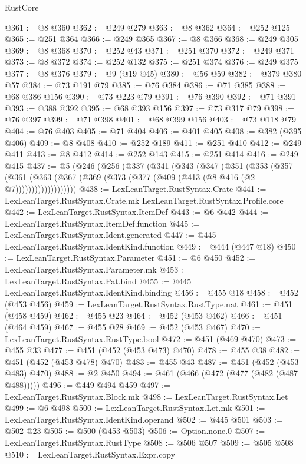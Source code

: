 \begin{lexlean}{RustCore}
\begin{coremodule}
@361 := @8 @360
@362 := @249 @279
@363 := @8 @362
@364 := @252 @125
@365 := @251 @364
@366 := @249 @365
@367 := @8 @366
@368 := @249 @305
@369 := @8 @368
@370 := @252 @43
@371 := @251 @370
@372 := @249 @371
@373 := @8 @372
@374 := @252 @132
@375 := @251 @374
@376 := @249 @375
@377 := @8 @376
@379 := @9 (@19 @45)
@380 := @56 @59
@382 := @379 @380 @57
@384 := @73 @191 @79
@385 := @76 @384
@386 := @71 @385
@388 := @68 @386 @156
@390 := @73 @223 @79
@391 := @76 @390
@392 := @71 @391
@393 := @388 @392
@395 := @68 @393 @156
@397 := @73 @317 @79
@398 := @76 @397
@399 := @71 @398
@401 := @68 @399 @156
@403 := @73 @118 @79
@404 := @76 @403
@405 := @71 @404
@406 := @401 @405
@408 := @382 (@395 @406)
@409 := @8 @408
@410 := @252 @189
@411 := @251 @410
@412 := @249 @411
@413 := @8 @412
@414 := @252 @143
@415 := @251 @414
@416 := @249 @415
@437 := @5
    (@246
      (@256
        (@337
          (@341
            (@343
              (@347
                (@351
                  (@353
                    (@357
                      (@361
                        (@363 (@367 (@369 (@373 (@377 (@409 (@413 (@8 @416 (@2 @7)))))))))))))))))))
@438 := LexLeanTarget.RustSyntax.Crate
@441 := LexLeanTarget.RustSyntax.Crate.mk LexLeanTarget.RustSyntax.Profile.core
@442 := LexLeanTarget.RustSyntax.ItemDef
@443 := @6 @442
@444 := LexLeanTarget.RustSyntax.ItemDef.function
@445 := LexLeanTarget.RustSyntax.Ident.generated
@447 := @445 LexLeanTarget.RustSyntax.IdentKind.function
@449 := @444 (@447 @18)
@450 := LexLeanTarget.RustSyntax.Parameter
@451 := @6 @450
@452 := LexLeanTarget.RustSyntax.Parameter.mk
@453 := LexLeanTarget.RustSyntax.Pat.bind
@455 := @445 LexLeanTarget.RustSyntax.IdentKind.binding
@456 := @455 @18
@458 := @452 (@453 @456)
@459 := LexLeanTarget.RustSyntax.RustType.nat
@461 := @451 (@458 @459)
@462 := @455 @23
@464 := @452 (@453 @462)
@466 := @451 (@464 @459)
@467 := @455 @28
@469 := @452 (@453 @467)
@470 := LexLeanTarget.RustSyntax.RustType.bool
@472 := @451 (@469 @470)
@473 := @455 @33
@477 := @451 (@452 (@453 @473) @470)
@478 := @455 @38
@482 := @451 (@452 (@453 @478) @470)
@483 := @455 @43
@487 := @451 (@452 (@453 @483) @470)
@488 := @2 @450
@494 := @461 (@466 (@472 (@477 (@482 (@487 @488)))))
@496 := @449 @494 @459
@497 := LexLeanTarget.RustSyntax.Block.mk
@498 := LexLeanTarget.RustSyntax.Let
@499 := @6 @498
@500 := LexLeanTarget.RustSyntax.Let.mk
@501 := LexLeanTarget.RustSyntax.IdentKind.operand
@502 := @445 @501
@503 := @502 @23
@505 := @500 (@453 @503)
@506 := Option.none.{0}
@507 := LexLeanTarget.RustSyntax.RustType
@508 := @506 @507
@509 := @505 @508
@510 := LexLeanTarget.RustSyntax.Expr.copy

\end{coremodule}
\end{lexlean}

